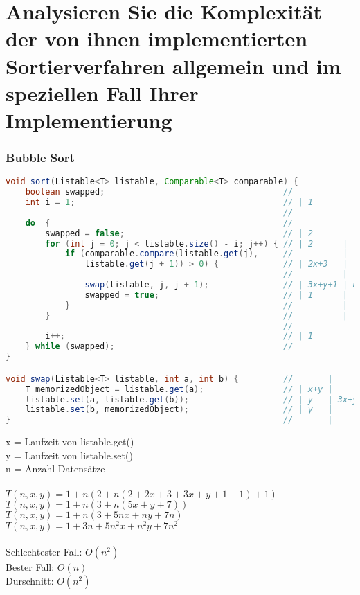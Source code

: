 \documentclass[a4paper, 11pt]{article}
\begin{document}
\section*{Analysieren Sie die Komplexität der von ihnen implementierten Sortierverfahren
          allgemein und im speziellen Fall Ihrer Implementierung}

\subsubsection*{Bubble Sort}

\begin{lstlisting}[language=java]
void sort(Listable<T> listable, Comparable<T> comparable) {
    boolean swapped;                                    //
    int i = 1;                                          // | 1
                                                        //
    do  {                                               //              |
        swapped = false;                                // | 2          |
        for (int j = 0; j < listable.size() - i; j++) { // | 2      |   |
            if (comparable.compare(listable.get(j),     //          |   |
                listable.get(j + 1)) > 0) {             // | 2x+3   |   |
                                                        //          |   |
                swap(listable, j, j + 1);               // | 3x+y+1 | n | n
                swapped = true;                         // | 1      |   |
            }                                           //          |   |
        }                                               //          |   |
                                                        //              |
        i++;                                            // | 1          |
    } while (swapped);                                  //              |
}

void swap(Listable<T> listable, int a, int b) {         //       |
    T memorizedObject = listable.get(a);                // | x+y |
    listable.set(a, listable.get(b));                   // | y   | 3x+y
    listable.set(b, memorizedObject);                   // | y   |
}                                                       //       |
\end{lstlisting}
x = Laufzeit von listable.get() \\
y = Laufzeit von listable.set() \\
n = Anzahl Datensätze \\
\ \\
\( T(n, x, y) = 1 + n(2 + n(2 + 2x + 3 + 3x + y + 1 + 1) + 1) \) \\
\( T(n, x, y) = 1 + n(3 + n(5x + y + 7)) \) \\
\( T(n, x, y) = 1 + n(3 + 5nx + ny + 7n) \) \\
\( T(n, x, y) = 1 + 3n + 5n^2x + n^2y + 7n^2 \) \\
\ \\
Schlechtester Fall:      \( O(n^2) \) \\
Bester Fall:             \( O(n) \)   \\
Durschnitt:              \( O(n^2) \) \\
\end{document}

